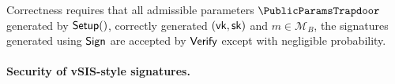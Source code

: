 Correctness requires that all admissible parameters $\PublicParamsTrapdoor$ generated by $\mathsf{Setup}()$, correctly generated $(\mathsf{vk},\mathsf{sk})$ and \(m\in\mathcal{M}_B\), the signatures generated using $\mathsf{Sign}$ are accepted by $\mathsf{Verify}$ except with
negligible probability.
\paragraph{Security of vSIS-style signatures.}

